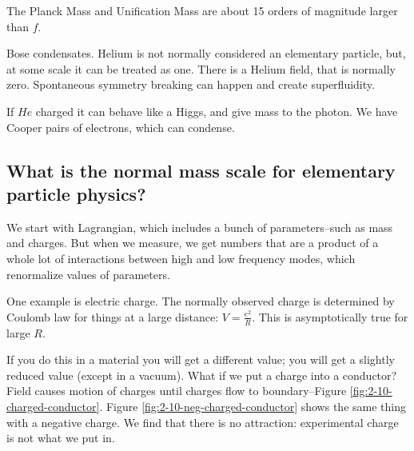 \documentclass[]{article}
\begin{document}
The Planck Mass and Unification Mass are about 15 orders of magnitude larger than $f$.

Bose condensates. Helium is not normally considered an elementary particle, but, at some scale it can be treated as one. There is a Helium field, that is normally zero. Spontaneous symmetry breaking can happen and create superfluidity.

If $He$ charged it can behave like a Higgs, and give mass to the photon. We have Cooper pairs of electrons, which can condense.

\subsection{What is the normal mass scale for elementary particle physics?}

We start with Lagrangian, which includes a bunch of parameters--such as mass and charges. But when we measure, we get numbers that are a product of a whole lot of interactions between high and low frequency modes, which renormalize values of parameters.

One example is electric charge. The normally observed charge is determined by Coulomb law for things at a large distance: $V=\frac{e^2}{R}$. This is asymptotically true for large $R$.

If you do this in a material you will get a different value; you will get a slightly reduced value (except in a vacuum). What if we put a charge into a conductor? Field causes motion of charges until charges flow to boundary--Figure \ref{fig:2-10-charged-conductor}. Figure \ref{fig:2-10-neg-charged-conductor} shows the same thing with a negative charge. We find that there is no attraction: experimental charge is not what we put in.
\end{document}
